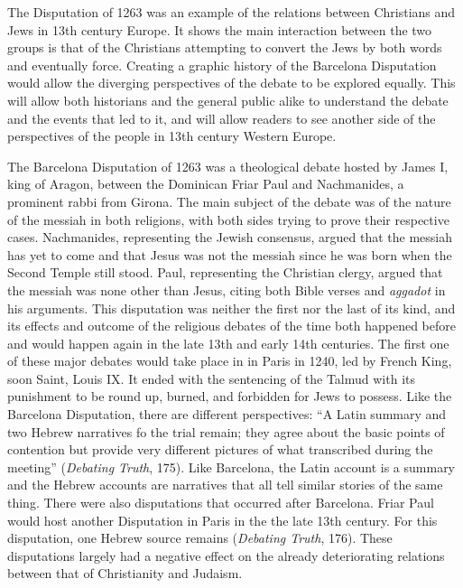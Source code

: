 \documentclass[12pt]{article}
\begin{document}
The Disputation of 1263 was an example of the relations between Christians and Jews in 13th century Europe.
It shows the main interaction between the two groups is that of the Christians attempting to convert the Jews by both words and eventually force.
Creating a graphic history of the Barcelona Disputation would allow the diverging perspectives of the debate to be explored equally.
This will allow both historians and the general public alike to understand the debate and the events that led to it, and will allow readers to see another side of the perspectives of the people in 13th century Western Europe.

The Barcelona Disputation of 1263 was a theological debate hosted by James I, king of Aragon, between the Dominican Friar Paul and Nachmanides, a prominent rabbi from Girona.
The main subject of the debate was of the nature of the messiah in both religions, with both sides trying to prove their respective cases.
Nachmanides, representing the Jewish consensus, argued that the messiah has yet to come and that Jesus was not the messiah since he was born when the Second Temple still stood.
Paul, representing the Christian clergy, argued that the messiah was none other than Jesus, citing both Bible verses and \emph{aggadot} in his arguments.
This disputation was neither the first nor the last of its kind, and its effects and outcome of the religious debates of the time both happened before and would happen again in the late 13th and early 14th centuries.
The first one of these major debates would take place in in Paris in 1240, led by French King, soon Saint, Louis IX.\@
It ended with the sentencing of the Talmud with its punishment to be round up, burned, and forbidden for Jews to possess.
Like the Barcelona Disputation, there are different perspectives:
``A Latin summary and two Hebrew narratives fo the trial remain; they agree about the basic points of contention but provide very different pictures of what transcribed during the meeting'' (\emph{Debating Truth}, 175).
Like Barcelona, the Latin account is a summary and the Hebrew accounts are narratives that all tell similar stories of the same thing.
There were also disputations that occurred after Barcelona.
Friar Paul would host another Disputation in Paris in the the late 13th century.
For this disputation, one Hebrew source remains (\emph{Debating Truth}, 176).
These disputations largely had a negative effect on the already deteriorating relations between that of Christianity and Judaism.
\end{document}
